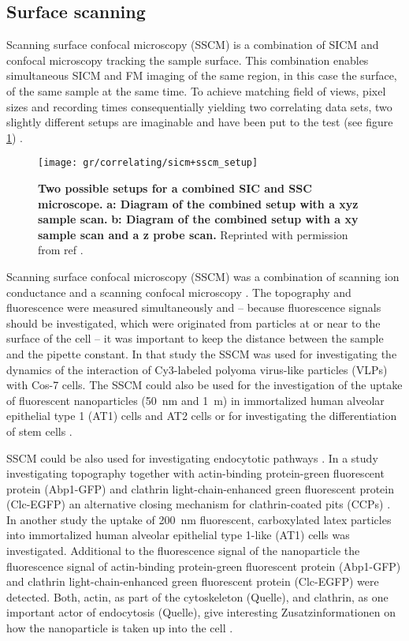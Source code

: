 \subsection{Surface scanning}

Scanning surface confocal microscopy (SSCM) \cite{Gorelik2002} is a combination of SICM and confocal 
microscopy tracking the sample surface. This combination enables simultaneous SICM and FM imaging of
the same region, in this case the surface, of the same sample at the same time. To achieve matching
field of views, pixel sizes and recording times consequentially yielding two correlating data sets,
two slightly different setups are imaginable and have been put to the test (see figure 
\ref{fig:sicm+sscm_setup}) \cite{Gorelik2002}\cite{Shevchuk2013}.
\begin{figure}
  \texttt{[image: gr/correlating/sicm+sscm\_setup]}
  \caption{%
    \textbf{Two possible setups for a combined SIC and SSC microscope.}
    \textbf{a: Diagram of the combined setup with a xyz sample scan.}
    \textbf{b: Diagram of the combined setup with a xy sample scan and a z probe scan.} 
    Reprinted with permission from ref \cite{Shevchuk2013}.
  }
  \label{fig:sicm+sscm_setup}
\end{figure}



Scanning surface confocal microscopy (SSCM) was a combination of scanning ion conductance and a 
scanning confocal microscopy \cite{Gorelik2002}. The topography and fluorescence were measured
simultaneously and -- because fluorescence signals should be investigated, which were originated
from particles at or near to the surface of the cell -- it was important to keep the distance 
between the sample and the pipette constant. In that study the SSCM was used for investigating the 
dynamics of the interaction of Cy3-labeled polyoma virus-like particles (VLPs) with Cos-7 cells. 
The SSCM could also be used for the investigation of the uptake of fluorescent nanoparticles 
(50~nm and 1~{\textmu}m) in immortalized human alveolar epithelial type 1 (AT1) cells and AT2 
cells \cite{Kemp2008} or for investigating the differentiation of stem cells \cite{Gorelik2008}.

SSCM could be also used for investigating endocytotic pathways \cite{Shevchuk2008}. In a study 
investigating topography together with actin-binding protein-green fluorescent protein (Abp1-GFP)
and clathrin light-chain-enhanced green fluorescent protein (Clc-EGFP) an alternative closing 
mechanism for clathrin-coated pits (CCPs) \cite{Shevchuk2012}. In another study the uptake of
200~nm fluorescent, carboxylated latex particles into immortalized human alveolar epithelial type
1-like (AT1) cells was investigated. Additional to the fluorescence signal of the nanoparticle the 
fluorescence signal of actin-binding protein-green fluorescent protein (Abp1-GFP) and clathrin
light-chain-enhanced green fluorescent protein (Clc-EGFP) were detected. Both, actin, as part of
the cytoskeleton (Quelle), and clathrin, as one important actor of endocytosis (Quelle), give 
interesting Zusatzinformationen on how the nanoparticle is taken up into the cell 
\cite{Novak2014}. 

